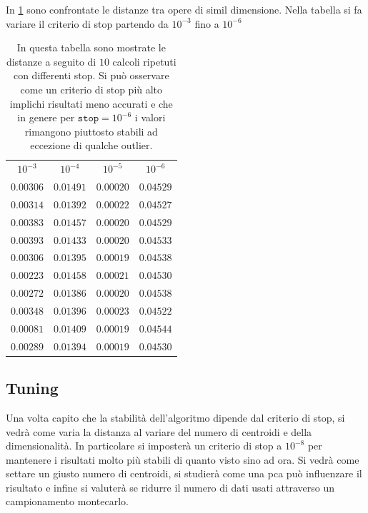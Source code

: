 \begin{toDo}
	\noindent In \cref{tab:distStability} sono confrontate le distanze tra opere di simil dimensione. Nella tabella si fa variare il criterio di stop partendo da $10^{-3}$ fino a $10^{-6}$

	\begin{table}[H]
		\centering
		\begin{tabular}{|c|c|c|c|}
			\hline
			\rowcolor{ambra}
			\multicolumn{4}{|c|}{stop criteria} \\
			\hline
			\rowcolor{lavender}
			$10^{-3}$ & $10^{-4}$ & $10^{-5}$ & $10^{-6}$ \\
			\hline
			$\num{0.00306}$ & $\num{0.01491}$ & $\num{0.00020}$ & $\num{0.04529}$ \\
			\hline
			$\num{0.00314}$ & $\num{0.01392}$ & $\num{0.00022}$ & $\num{0.04527}$ \\
			\hline
			$\num{0.00383}$ & $\num{0.01457}$ & $\num{0.00020}$ & $\num{0.04529}$ \\
			\hline
			$\num{0.00393}$ & $\num{0.01433}$ & $\num{0.00020}$ & $\num{0.04533}$ \\
			\hline
			$\num{0.00306}$ & $\num{0.01395}$ & $\num{0.00019}$ & $\num{0.04538}$ \\
			\hline
			$\num{0.00223}$ & $\num{0.01458}$ & $\num{0.00021}$ & $\num{0.04530}$ \\
			\hline
			$\num{0.00272}$ & $\num{0.01386}$ & $\num{0.00020}$ & $\num{0.04538}$ \\
			\hline
			$\num{0.00348}$ & $\num{0.01396}$ & $\num{0.00023}$ & $\num{0.04522}$ \\
			\hline
			$\num{0.00081}$ & $\num{0.01409}$ & $\num{0.00019}$ & $\num{0.04544}$  \\
			\hline
			$\num{0.00289}$ & $\num{0.01394}$ & $\num{0.00019}$ & $\num{0.04530}$ \\
			\hline
		\end{tabular}
		\caption[Stability of comparison algorithm]{In questa tabella sono mostrate le distanze a seguito di $10$ calcoli ripetuti con differenti stop. Si può osservare come un criterio di stop più alto implichi risultati meno accurati e che in genere per $\texttt{stop}=10^{-6}$ i valori rimangono piuttosto stabili ad eccezione di qualche outlier.}
		\label{tab:distStability}
	\end{table}

	\subsection{Tuning}
	Una volta capito che la stabilità dell'algoritmo dipende dal criterio di stop, si vedrà come varia la distanza al variare del numero di centroidi e della dimensionalità. In particolare si imposterà un criterio di stop a $10^{-8}$ per mantenere i risultati molto più stabili di quanto visto sino ad ora. Si vedrà come settare un giusto numero di centroidi, si studierà come una \gls{pca} può influenzare il risultato e infine si valuterà se ridurre il numero di dati usati attraverso un campionamento montecarlo.


\end{toDo}

